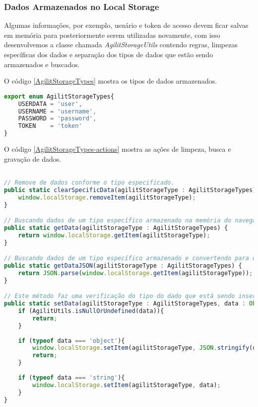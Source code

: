 \subsubsection{Dados Armazenados no Local Storage}
Algumas informações, por exemplo, usuário e token de acesso devem ficar salvas em memória para posteriormente serem utilizadas novamente, com isso desenvolvemos a classe chamada \textit{AgilitStorageUtils} contendo regras, limpezas específicas dos dados e separação dos tipos de dados que estão sendo armazenados e buscados.

O código \ref{AgilitStorageTypes} mostra os tipos de dados armazenados.
\begin{lstlisting}[language=JavaScript, caption={Tipos de dados armazenados}, label={AgilitStorageTypes}]
export enum AgilitStorageTypes{
	USERDATA = 'user',
	USERNAME = 'username',
	PASSWORD = 'password',
	TOKEN    = 'token'
}
\end{lstlisting}

O código \ref{AgilitStorageTypes-actions} mostra as ações de limpeza, busca e gravação de dados.

\begin{lstlisting}[language=JavaScript, caption={Tipos de dados armazenados}, label={AgilitStorageTypes-actions}]

// Remove de dados conforme o tipo especificado.
public static clearSpecificData(agilitStorageType : AgilitStorageTypes) {
	window.localStorage.removeItem(agilitStorageType);
}

// Buscando dados de um tipo específico armazenado na memória do navegador.
public static getData(agilitStorageType : AgilitStorageTypes) {
	return window.localStorage.getItem(agilitStorageType);
}

// Buscando dados de um tipo específico armazenado e convertendo para objeto.
public static getDataJSON(agilitStorageType : AgilitStorageTypes) {
	return JSON.parse(window.localStorage.getItem(agilitStorageType));
}

// Este método faz uma verificação do tipo do dado que está sendo inserido na memória do navegador.
public static setData(agilitStorageType : AgilitStorageTypes, data : Object|Array<any>|string) {
	if (AgilitUtils.isNullOrUndefined(data)){
		return;
	}
	
	if (typeof data === 'object'){
		window.localStorage.setItem(agilitStorageType, JSON.stringify(data));
		return;
	}
	
	if (typeof data === 'string'){
		window.localStorage.setItem(agilitStorageType, data);
	}    
}
\end{lstlisting}

